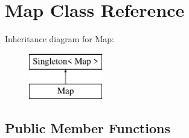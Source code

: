 \hypertarget{class_map}{}\section{Map Class Reference}
\label{class_map}
Inheritance diagram for Map\+:\begin{figure}[H]
\begin{center}
\leavevmode
\includegraphics[height=2.000000cm]{class_map}
\end{center}
\end{figure}
\subsection*{Public Member Functions}
